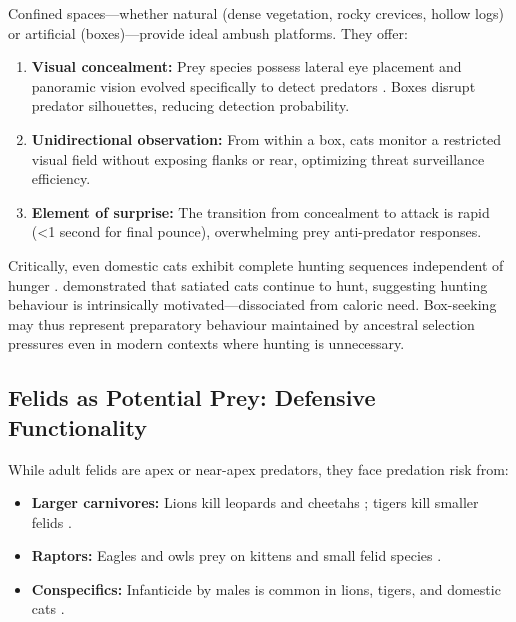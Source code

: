 \documentclass[12pt,a4paper]{article}
\begin{document}
Confined spaces—whether natural (dense vegetation, rocky crevices, hollow logs) or artificial (boxes)—provide ideal ambush platforms. They offer:

\begin{enumerate}
    \item \textbf{Visual concealment:} Prey species possess lateral eye placement and panoramic vision evolved specifically to detect predators \citep{cronin2005}. Boxes disrupt predator silhouettes, reducing detection probability.
    
    \item \textbf{Unidirectional observation:} From within a box, cats monitor a restricted visual field without exposing flanks or rear, optimizing threat surveillance efficiency.
    
    \item \textbf{Element of surprise:} The transition from concealment to attack is rapid (<1 second for final pounce), overwhelming prey anti-predator responses.
\end{enumerate}

Critically, even domestic cats exhibit complete hunting sequences independent of hunger \citep{bradshaw2013}. \citet{hall1998} demonstrated that satiated cats continue to hunt, suggesting hunting behaviour is intrinsically motivated—dissociated from caloric need. Box-seeking may thus represent preparatory behaviour maintained by ancestral selection pressures even in modern contexts where hunting is unnecessary.

\subsection{Felids as Potential Prey: Defensive Functionality}

While adult felids are apex or near-apex predators, they face predation risk from:

\begin{itemize}
    \item \textbf{Larger carnivores:} Lions kill leopards and cheetahs \citep{mills1990}; tigers kill smaller felids \citep{karanth1995}.
    
    \item \textbf{Raptors:} Eagles and owls prey on kittens and small felid species \citep{love1984}.
    
    \item \textbf{Conspecifics:} Infanticide by males is common in lions, tigers, and domestic cats \citep{pusey1983}.
\end{itemize}
\end{document}
